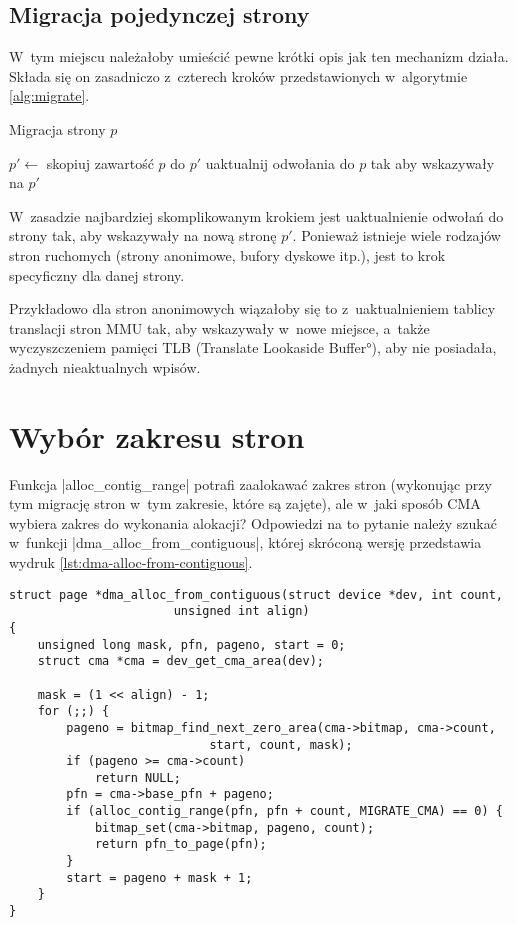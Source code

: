 \subsection{Migracja pojedynczej strony}

 W~tym miejscu należałoby umieścić pewne
krótki opis jak ten mechanizm działa.  Składa się on zasadniczo
z~czterech kroków przedstawionych w~algorytmie \ref{alg:migrate}.

\begin{algorithm}
\caption{Migracja strony $p$}
\label{alg:migrate}
\begin{algorithmic}[1]
    \State $p' \gets$ 
    \State skopiuj zawartość $p$ do $p'$
    \State uaktualnij odwołania do $p$ tak aby wskazywały na $p'$
    \State {}
\EndProcedure
\end{algorithmic}
\end{algorithm}

 W~zasadzie najbardziej skomplikowanym krokiem
jest uaktualnienie odwołań do strony tak, aby wskazywały na nową
stronę $p'$.  Ponieważ istnieje wiele rodzajów stron ruchomych (strony
anonimowe, bufory dyskowe itp.), jest to krok specyficzny dla danej
strony.

Przykładowo dla stron anonimowych wiązałoby się to z~uaktualnieniem
tablicy translacji stron MMU tak, aby wskazywały w~nowe miejsce,
a~także wyczyszczeniem pamięci TLB (\ang{Translate Lookaside Buffer}),
aby nie posiadała, żadnych nieaktualnych wpisów.


\section{Wybór zakresu stron}

Funkcja \code|alloc_contig_range| potrafi zaalokawać zakres
stron (wykonując przy tym migrację stron w~tym zakresie, które są
zajęte), ale w~jaki sposób CMA wybiera zakres do wykonania alokacji?
Odpowiedzi na to pytanie należy szukać w~funkcji
\code|dma_alloc_from_contiguous|, której skróconą wersję
przedstawia wydruk \ref{lst:dma-alloc-from-contiguous}.

\begin{lstlisting}[float=tbhp,caption={Skrócony wydruk funkcji
    \code|dma_alloc_from_contiguous| z Linuksa
    3.5.},label=lst:dma-alloc-from-contiguous]
struct page *dma_alloc_from_contiguous(struct device *dev, int count,
				       unsigned int align)
{
	unsigned long mask, pfn, pageno, start = 0;
	struct cma *cma = dev_get_cma_area(dev);

	mask = (1 << align) - 1;
	for (;;) {
		pageno = bitmap_find_next_zero_area(cma->bitmap, cma->count,
						    start, count, mask);
		if (pageno >= cma->count)
			return NULL;
		pfn = cma->base_pfn + pageno;
		if (alloc_contig_range(pfn, pfn + count, MIGRATE_CMA) == 0) {
			bitmap_set(cma->bitmap, pageno, count);
			return pfn_to_page(pfn);
		}
		start = pageno + mask + 1;
	}
}
\end{lstlisting}

